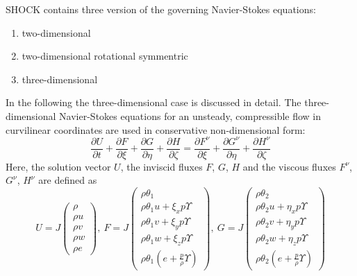 SHOCK contains three version of the governing Navier-Stokes equations:
\begin{enumerate}
\item two-dimensional
\item two-dimensional rotational symmentric
\item three-dimensional
\end{enumerate}

In the following the three-dimensional case is discussed in detail.
The three-dimensional Navier-Stokes equations for an unsteady, compressible flow in curvilinear coordinates are used in conservative non-dimensional form:
\begin{equation}
\label{eq:eq0}
\frac{\partial U}{\partial t}
+\frac{\partial F}{\partial \xi}+\frac{\partial G}{\partial \eta}+\frac{\partial H}{\partial \zeta}
=\frac{\partial F^\nu}{\partial \xi}+\frac{\partial G^\nu}{\partial \eta}+\frac{\partial H^\nu}{\partial \zeta}
\end{equation}
Here, the solution vector $U$, the inviscid fluxes $F$, $G$, $H$ and the viscous fluxes $F^\nu$, $G^\nu$, $H^\nu$ are defined as
\small 
\begin{equation}
U=J
\begin{pmatrix}
\rho
\\
\rho u
\\
\rho v
\\
\rho w
\\
\rho e
\end{pmatrix}
,\ 
F=J
\begin{pmatrix}
\rho \theta_1
\\
\rho \theta_1 u +\xi_x p \Upsilon
\\
\rho \theta_1 v +\xi_y p \Upsilon
\\
\rho \theta_1 w +\xi_z p \Upsilon
\\
\rho \theta_1 \left( e+\frac{p}{\rho} \Upsilon\right)
\end{pmatrix}
,\ 
G=J
\begin{pmatrix}
\rho \theta_2
\\
\rho \theta_2 u +\eta_x p \Upsilon
\\
\rho \theta_2 v +\eta_y p \Upsilon
\\
\rho \theta_2 w +\eta_z p \Upsilon
\\
\rho \theta_2 \left( e+\frac{p}{\rho} \Upsilon\right)
\end{pmatrix}
\label{eq1}
\end{equation}

